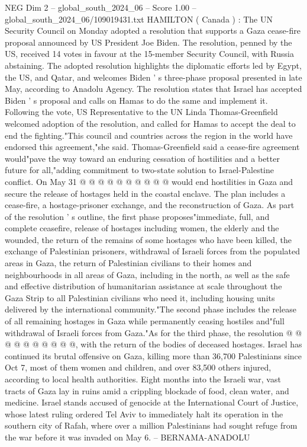 \begin{textsample}{NEG Dim 2 – global\_south\_2024\_06 – Score 1.00 – global\_south\_2024\_06/109019431.txt}  \label{ex:f2_neg_333}
HAMILTON ( Canada ) : The UN Security Council on Monday adopted a resolution that supports a Gaza cease-fire proposal announced by US President Joe Biden.
The resolution, penned by the US, received 14 votes in favour at the 15-member Security Council, with Russia abstaining.
The adopted resolution highlights the diplomatic efforts led by Egypt, the US, and Qatar, and welcomes Biden ' s three-phase proposal presented in late May, according to Anadolu Agency.
The resolution states that Israel has accepted Biden ' s proposal and calls on Hamas to do the same and implement it.
Following the vote, US Representative to the UN Linda Thomas-Greenfield welcomed adoption of the resolution, and called for Hamas to accept the deal to end the fighting."This council and countries across the region in the world have endorsed this agreement,"she said.
Thomas-Greenfield said a cease-fire agreement would"pave the way toward an enduring cessation of hostilities and a better future for all,"adding commitment to two-state solution to Israel-Palestine conflict.
On May 31 @ @ @ @ @ @ @ @ @ @ would end hostilities in Gaza and secure the release of hostages held in the coastal enclave.
The plan includes a cease-fire, a hostage-prisoner exchange, and the reconstruction of Gaza.
As part of the resolution ' s outline, the first phase proposes"immediate, full, and complete ceasefire, release of hostages including women, the elderly and the wounded, the return of the remains of some hostages who have been killed, the exchange of Palestinian prisoners, withdrawal of Israeli forces from the populated areas in Gaza, the return of Palestinian civilians to their homes and neighbourhoods in all areas of Gaza, including in the north, as well as the safe and effective distribution of humanitarian assistance at scale throughout the Gaza Strip to all Palestinian civilians who need it, including housing units delivered by the international community."The second phase includes the release of all remaining hostages in Gaza while permanently ceasing hostiles and"full withdrawal of Israeli forces from Gaza."As for the third phase, the resolution @ @ @ @ @ @ @ @ @ @, with the return of the bodies of deceased hostages.
Israel has continued its brutal offensive on Gaza, killing more than 36,700 Palestinians since Oct 7, most of them women and children, and over 83,500 others injured, according to local health authorities.
Eight months into the Israeli war, vast tracts of Gaza lay in ruins amid a crippling blockade of food, clean water, and medicine.
Israel stands accused of genocide at the International Court of Justice, whose latest ruling ordered Tel Aviv to immediately halt its operation in the southern city of Rafah, where over a million Palestinians had sought refuge from the war before it was invaded on May 6. -- BERNAMA-ANADOLU

\end{textsample}
